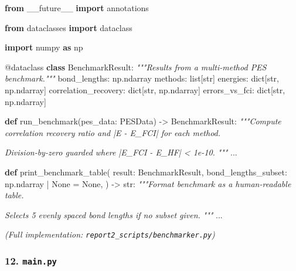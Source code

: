\documentclass[
  11pt,
]{report}
\newenvironment{Shaded}{}{}
\newcommand{\AttributeTok}[1]{\textcolor[rgb]{0.49,0.56,0.16}{#1}}
\newcommand{\BuiltInTok}[1]{\textcolor[rgb]{0.00,0.50,0.00}{#1}}
\newcommand{\CommentTok}[1]{\textcolor[rgb]{0.38,0.63,0.69}{\textit{#1}}}
\newcommand{\ImportTok}[1]{\textcolor[rgb]{0.00,0.50,0.00}{\textbf{#1}}}
\newcommand{\KeywordTok}[1]{\textcolor[rgb]{0.00,0.44,0.13}{\textbf{#1}}}
\newcommand{\NormalTok}[1]{#1}
\newcommand{\OperatorTok}[1]{\textcolor[rgb]{0.40,0.40,0.40}{#1}}
\newcommand{\VariableTok}[1]{\textcolor[rgb]{0.10,0.09,0.49}{#1}}
\begin{document}
\begin{Shaded}
\begin{Highlighting}[]
\ImportTok{from}\NormalTok{ \_\_future\_\_ }\ImportTok{import}\NormalTok{ annotations}

\ImportTok{from}\NormalTok{ dataclasses }\ImportTok{import}\NormalTok{ dataclass}

\ImportTok{import}\NormalTok{ numpy }\ImportTok{as}\NormalTok{ np}


\AttributeTok{@dataclass}
\KeywordTok{class}\NormalTok{ BenchmarkResult:}
    \CommentTok{"""Results from a multi{-}method PES benchmark."""}
\NormalTok{    bond\_lengths: np.ndarray}
\NormalTok{    methods: }\BuiltInTok{list}\NormalTok{[}\BuiltInTok{str}\NormalTok{]}
\NormalTok{    energies: }\BuiltInTok{dict}\NormalTok{[}\BuiltInTok{str}\NormalTok{, np.ndarray]}
\NormalTok{    correlation\_recovery: }\BuiltInTok{dict}\NormalTok{[}\BuiltInTok{str}\NormalTok{, np.ndarray]}
\NormalTok{    errors\_vs\_fci: }\BuiltInTok{dict}\NormalTok{[}\BuiltInTok{str}\NormalTok{, np.ndarray]}


\KeywordTok{def}\NormalTok{ run\_benchmark(pes\_data: PESData) }\OperatorTok{{-}\textgreater{}}\NormalTok{ BenchmarkResult:}
    \CommentTok{"""Compute correlation recovery ratio and |E {-} E\_FCI| for each method.}

\CommentTok{    Division{-}by{-}zero guarded where |E\_FCI {-} E\_HF| \textless{} 1e{-}10.}
\CommentTok{    """}
\NormalTok{    ...}


\KeywordTok{def}\NormalTok{ print\_benchmark\_table(}
\NormalTok{    result: BenchmarkResult,}
\NormalTok{    bond\_lengths\_subset: np.ndarray }\OperatorTok{|} \VariableTok{None} \OperatorTok{=} \VariableTok{None}\NormalTok{,}
\NormalTok{) }\OperatorTok{{-}\textgreater{}} \BuiltInTok{str}\NormalTok{:}
    \CommentTok{"""Format benchmark as a human{-}readable table.}

\CommentTok{    Selects 5 evenly spaced bond lengths if no subset given.}
\CommentTok{    """}
\NormalTok{    ...}
\end{Highlighting}
\end{Shaded}

\emph{(Full implementation: \texttt{report2\_scripts/benchmarker.py})}

\subsubsection{\texorpdfstring{12.
\texttt{main.py}}{12. main.py}}\label{main.py}
\end{document}
